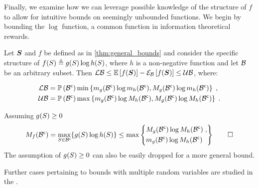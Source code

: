 Finally, we examine how we can leverage possible knowledge of the structure of $f$ to allow for intuitive bounds on seemingly unbounded functions. We begin by bounding the $\log$ function, a common function in information theoretical rewards.

\begin{propositionE}
	\label{thm:bound_log}
	Let $\boldsymbol S$ and $f$ be defined as in \cref{thm:general_bounds} and consider the specific structure of $f(S)\triangleq g(S)\log h(S)$, where $h$ is a non-negative function and let $\mathcal B$ be an arbitrary subset. Then $\operatorname*{\mathcal{LB}}\leq\operatorname*{\mathbb{E}}\limits_{}\left[{f(\boldsymbol S)}\right]-\mathcal{E}_{\mathcal B}\left[{f(\boldsymbol S)}\right]\leq\operatorname*{\mathcal{UB}}$, where:
	\begin{subequations}
		\begin{align}
			\operatorname*{\mathcal{LB}} & = \mathbb{P}\left({{\mathcal B}^{\mathsf{c}}}\right)
			\min\left\{m_g({\mathcal B}^{\mathsf{c}})\log m_h({\mathcal B}^{\mathsf{c}}),M_g({\mathcal B}^{\mathsf{c}})\log m_h({\mathcal B}^{\mathsf{c}})\right\}\;,\label{eq:bound_lower_log}\\
			\operatorname*{\mathcal{UB}} & = \mathbb{P}\left({{\mathcal B}^{\mathsf{c}}}\right)
			\max\left\{m_g({\mathcal B}^{\mathsf{c}})\log M_h({\mathcal B}^{\mathsf{c}}),M_g({\mathcal B}^{\mathsf{c}})\log M_h({\mathcal B}^{\mathsf{c}})\right\}\;\label{eq:bound_upper_log}.
		\end{align}
	\end{subequations}
\end{propositionE}
\begin{proofE}
	Assuming $g(S)\geq 0$
	\begin{equation*}
		M_f({\mathcal B}^{\mathsf{c}})=\max_{S\in{\ensuremath{\mathcal B}}^{\mathsf{c}}}\{g(S)\log h(S)\}\leq\max\left\{
		\begin{aligned}
			& M_g({\mathcal B}^{\mathsf{c}})\log M_h({\mathcal B}^{\mathsf{c}})\;, \\
			& m_g({\mathcal B}^{\mathsf{c}})\log M_h({\mathcal B}^{\mathsf{c}})
		\end{aligned}\right\}\qed
	\end{equation*}
	The assumption of $g(S)\geq 0$ can also be easily dropped for a more general bound.
\end{proofE}
Further cases pertaining to bounds with multiple random variables are studied in the .

